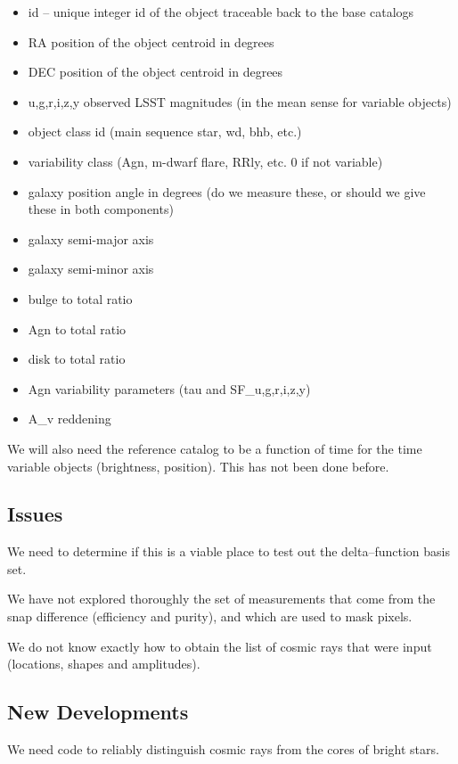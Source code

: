 \documentclass[12pt]{article}
\begin{document}
\begin{itemize}
\item id -- unique integer id of the object traceable back to the base catalogs
\item RA position of the object centroid in degrees
\item DEC position of the object centroid in degrees
\item {u,g,r,i,z,y} observed LSST magnitudes (in the mean sense for variable objects)
\item object class id (main sequence star, wd, bhb, etc.)
\item variability class (Agn, m-dwarf flare, RRly, etc. 0 if not variable)
\item galaxy position angle in degrees (do we measure these, or should we give these in both components)
\item galaxy semi-major axis 
\item galaxy semi-minor axis
\item bulge to total ratio
\item Agn to total ratio
\item disk to total ratio
\item Agn variability parameters (tau and SF\_{u,g,r,i,z,y})
\item A\_v reddening 
\end{itemize}

We will also need the reference catalog to be a function of time for
the time variable objects (brightness, position).  This has not been
done before.

\subsection{Issues}

We need to determine if this is a viable place to test out the
delta--function basis set.

We have not explored thoroughly the set of measurements that come from
the snap difference (efficiency and purity), and which are used to
mask pixels.

We do not know exactly how to obtain the list of cosmic rays that were
input (locations, shapes and amplitudes).

\subsection{New Developments}

We need code to reliably distinguish cosmic rays from the cores of
bright stars.
\end{document}
